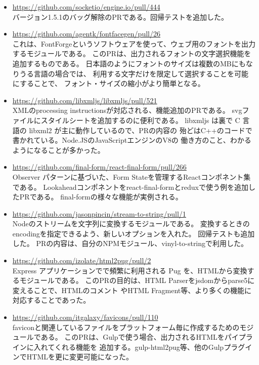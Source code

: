 \documentclass{res}
\begin{document}
\begin{resume}
\begin{itemize}
  \item \url{https://github.com/socketio/engine.io/pull/444} \\
  バージョン1.5.1のバッグ解除のPRである。回帰テストを追加した。

  \item \url{https://github.com/agentk/fontfacegen/pull/26} \\
  これは、FontForgeというソフトウェアを使って、ウェブ用のフォントを出力するモジュールである。
  このPRは、出力されるフォントの文字選択機能を追加するものである。
  日本語のようにフォントのサイズは複数のMBにもなりうる言語の場合では、
  利用する文字だけを限定して選択することを可能にすることで、
  フォント・サイズの縮小がより簡単となる。

  \item \url{https://github.com/libxmljs/libxmljs/pull/521} \\
  XMLのprocessing instructionsが対応される、機能追加のPRである。
  svgファイルにスタイルシートを追加するのに便利である。
  libxmljs は裏で C 言語の libxml2 が主に動作しているので、PRの内容の
  殆どはC++のコードで書かれている。Node.JSのJavaScriptエンジンのV8の
  働き方のこと、わかるようになることが多かった。

  \item \url{https://github.com/final-form/react-final-form/pull/266} \\
  Observer パターンに基づいた、Form Stateを管理するReactコンポネント集である。
  Lookaheadコンポネントをreact-final-formとreduxで使う例を追加したPRである。
  final-formの様々な機能が実例される。

  \item \url{https://github.com/jasonpincin/stream-to-string/pull/1} \\
  Nodeのストリームを文字列に変換するモジュールである。
  変換するときのencodingを指定できるよう、新しいオプションを入れた。
  回帰テストも追加した。
  PRの内容は、自分のNPMモジュール、vinyl-to-stringで利用した。

  \item \url{https://github.com/izolate/html2pug/pull/2} \\
  Express アプリケーションでで頻繁に利用される Pug を、HTMLから変換するモジュールである。
  このPRの目的は、HTML Parserをjsdomからparse5に変えることで、HTMLのコメント
  やHTML Fragment等、より多くの機能に対応することであった。

  \item \url{https://github.com/itgalaxy/favicons/pull/110} \\
  faviconと関連しているファイルをプラットフォーム毎に作成するためのモジュールである。
  このPRは、Gulpで使う場合、出力されるHTMLをパイプラインに入れてくれる機能を
  追加する。gulp-html2pug等、他のGulpプラグインでHTMLを更に変更可能になった。


\end{itemize}
\end{resume}
\end{document}
